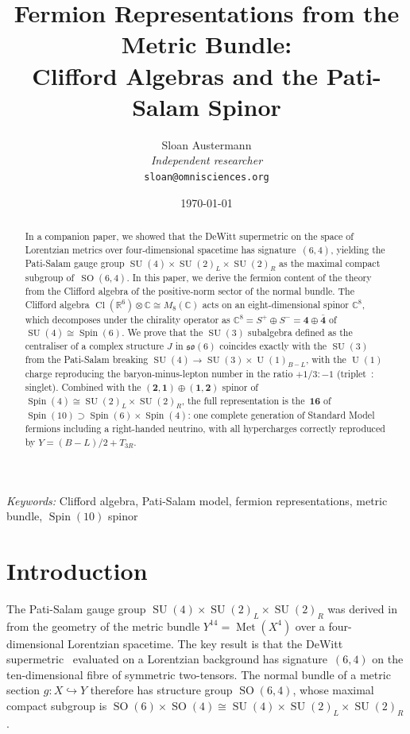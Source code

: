 \documentclass[12pt,a4paper]{article}
\title{\textbf{Fermion Representations from the Metric Bundle:\\ Clifford Algebras and the Pati-Salam Spinor}}
\author{Sloan Austermann\\[4pt]
\small\textit{Independent researcher}\\
\small\texttt{sloan@omnisciences.org}}
\date{\today}
\theoremstyle{definition}
\newcommand{\Met}{\operatorname{Met}}
\newcommand{\SO}{\operatorname{SO}}
\newcommand{\SU}{\operatorname{SU}}
\newcommand{\U}{\operatorname{U}}
\newcommand{\Spin}{\operatorname{Spin}}
\newcommand{\Cl}{\operatorname{Cl}}
\newcommand{\R}{\mathbb{R}}
\newcommand{\C}{\mathbb{C}}
\begin{document}
\maketitle

\begin{abstract}
In a companion paper, we showed that the DeWitt supermetric on the space of Lorentzian metrics over four-dimensional spacetime has signature~$(6,4)$, yielding the Pati-Salam gauge group $\SU(4) \times \SU(2)_L \times \SU(2)_R$ as the maximal compact subgroup of~$\SO(6,4)$.
In this paper, we derive the fermion content of the theory from the Clifford algebra of the positive-norm sector of the normal bundle.
The Clifford algebra $\Cl(\R^6) \otimes \C \cong M_8(\C)$ acts on an eight-dimensional spinor $\C^8$, which decomposes under the chirality operator as $\C^8 = S^+ \oplus S^- = \mathbf{4} \oplus \bar{\mathbf{4}}$ of $\SU(4) \cong \Spin(6)$.
We prove that the $\SU(3)$ subalgebra defined as the centraliser of a complex structure $J$ in $\mathfrak{so}(6)$ coincides exactly with the $\SU(3)$ from the Pati-Salam breaking $\SU(4) \to \SU(3) \times \U(1)_{B-L}$, with the $\U(1)$ charge reproducing the baryon-minus-lepton number in the ratio $+1/3 : -1$ (triplet~: singlet).
Combined with the $(\mathbf{2},\mathbf{1}) \oplus (\mathbf{1},\mathbf{2})$ spinor of $\Spin(4) \cong \SU(2)_L \times \SU(2)_R$, the full representation is the~$\mathbf{16}$ of $\Spin(10) \supset \Spin(6) \times \Spin(4)$: one complete generation of Standard Model fermions including a right-handed neutrino, with all hypercharges correctly reproduced by $Y = (B{-}L)/2 + T_{3R}$.
\end{abstract}

\vspace{10pt}
\noindent\textit{Keywords:} Clifford algebra, Pati-Salam model, fermion representations, metric bundle, $\Spin(10)$ spinor

\newpage
\tableofcontents
\newpage

\section{Introduction}
\label{sec:intro}

The Pati-Salam gauge group $\SU(4) \times \SU(2)_L \times \SU(2)_R$ was derived in~\cite{Paper1} from the geometry of the metric bundle $Y^{14} = \Met(X^4)$ over a four-dimensional Lorentzian spacetime.
The key result is that the DeWitt supermetric~\cite{DeWitt1967} evaluated on a Lorentzian background has signature~$(6,4)$ on the ten-dimensional fibre of symmetric two-tensors.
The normal bundle of a metric section $g\colon X \hookrightarrow Y$ therefore has structure group $\SO(6,4)$, whose maximal compact subgroup is $\SO(6) \times \SO(4) \cong \SU(4) \times \SU(2)_L \times \SU(2)_R$.
\end{document}
